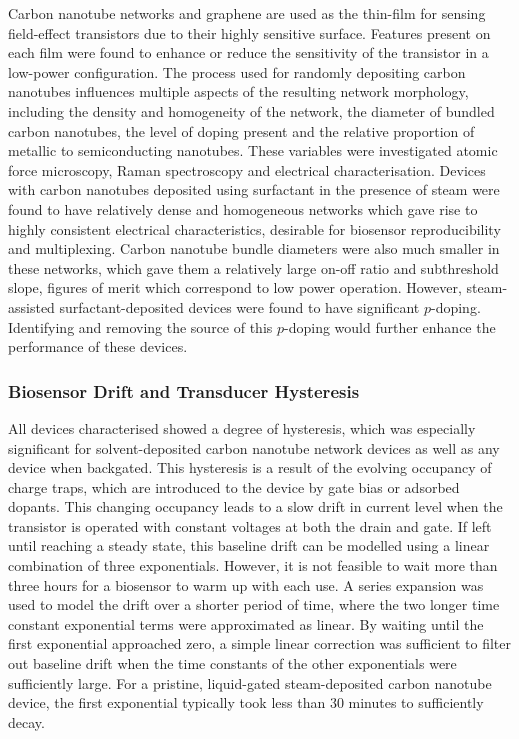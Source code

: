 \documentclass[
  letterpaper,
  DIV=11,
  numbers=noendperiod]{scrartcl}
\begin{document}
Carbon nanotube networks and graphene are used as the thin-film for
sensing field-effect transistors due to their highly sensitive surface.
Features present on each film were found to enhance or reduce the
sensitivity of the transistor in a low-power configuration. The process
used for randomly depositing carbon nanotubes influences multiple
aspects of the resulting network morphology, including the density and
homogeneity of the network, the diameter of bundled carbon nanotubes,
the level of doping present and the relative proportion of metallic to
semiconducting nanotubes. These variables were investigated atomic force
microscopy, Raman spectroscopy and electrical characterisation. Devices
with carbon nanotubes deposited using surfactant in the presence of
steam were found to have relatively dense and homogeneous networks which
gave rise to highly consistent electrical characteristics, desirable for
biosensor reproducibility and multiplexing. Carbon nanotube bundle
diameters were also much smaller in these networks, which gave them a
relatively large on-off ratio and subthreshold slope, figures of merit
which correspond to low power operation. However, steam-assisted
surfactant-deposited devices were found to have significant
\(p\)-doping. Identifying and removing the source of this \(p\)-doping
would further enhance the performance of these devices.

\hypertarget{biosensor-drift-and-transducer-hysteresis}{%
\subsubsection{Biosensor Drift and Transducer
Hysteresis}\label{biosensor-drift-and-transducer-hysteresis}}

All devices characterised showed a degree of hysteresis, which was
especially significant for solvent-deposited carbon nanotube network
devices as well as any device when backgated. This hysteresis is a
result of the evolving occupancy of charge traps, which are introduced
to the device by gate bias or adsorbed dopants. This changing occupancy
leads to a slow drift in current level when the transistor is operated
with constant voltages at both the drain and gate. If left until
reaching a steady state, this baseline drift can be modelled using a
linear combination of three exponentials. However, it is not feasible to
wait more than three hours for a biosensor to warm up with each use. A
series expansion was used to model the drift over a shorter period of
time, where the two longer time constant exponential terms were
approximated as linear. By waiting until the first exponential
approached zero, a simple linear correction was sufficient to filter out
baseline drift when the time constants of the other exponentials were
sufficiently large. For a pristine, liquid-gated steam-deposited carbon
nanotube device, the first exponential typically took less than 30
minutes to sufficiently decay.
\end{document}
